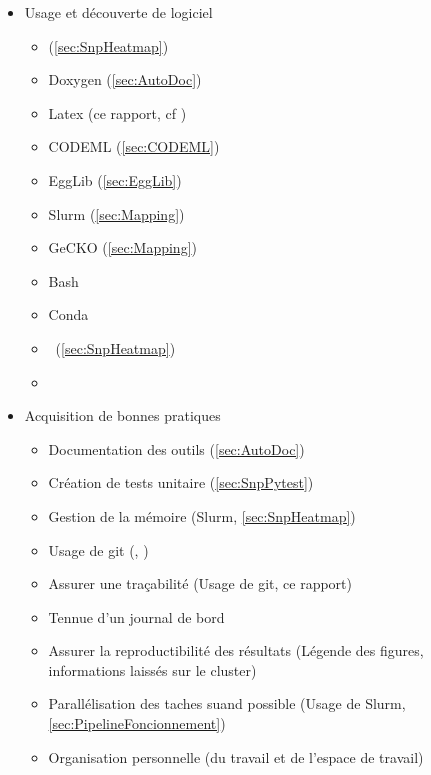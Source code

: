 \begin{itemize}
    \item Usage et découverte de logiciel
    \begin{itemize}
        \item \Python (\cref{sec:SnpHeatmap})
        \item \gls{Doxygen} (\cref{sec:AutoDoc})
        \item \gls{Latex} (ce rapport, cf \cite{florent_f-marchalm1bioinfointernship2024-inrae_agap_ge2pop_2024})
        \item \gls{CODEML} (\cref{sec:CODEML})
        \item \gls{EggLib} (\cref{sec:EggLib})
        \item \gls{Slurm} (\cref{sec:Mapping})
        \item \gls{GeCKO} (\cref{sec:Mapping})
        \item \gls{Bash} 
        \item \gls{Conda}
        \item \GitHub (\cref{sec:SnpHeatmap})
        \item 
        
    \end{itemize}
    
    \item Acquisition de bonnes pratiques
    \begin{itemize}
        \item Documentation des outils (\cref{sec:AutoDoc})
        \item Création de tests unitaire (\cref{sec:SnpPytest})
        \item Gestion de la mémoire (\gls{Slurm}, \cref{sec:SnpHeatmap})
        \item Usage de \gls{git} (\cite{florent_f-marchalm1bioinfointernship2024-inrae_agap_ge2pop_2024}, \cite{florent_f-marchalsnpheatmap_2024})
        \item Assurer une traçabilité (Usage de \gls{git}, ce rapport)
        \item Tennue d'un journal de bord
        \item Assurer la reproductibilité des résultats (Légende des figures, informations laissés sur le \Gls{cluster})
        \item Parallélisation des taches suand possible (Usage de \gls{Slurm}, \cref{sec:PipelineFoncionnement})
        \item Organisation personnelle (du travail et de l'espace de travail)
    \end{itemize}


\end{itemize}
